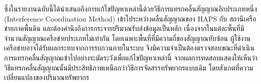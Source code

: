 ซึ่งในรายงานฉบับนี้ได้นำเสนอถึงการแก้ไขปัญหาเหล่านี้ด้วยวิธีการแทรกคลื่นสัญญาณอีกประเภทหนึ่ง
(Interference Coordination Method) เข้าไประหว่างคลื่นสัญญาณของ HAPS กับ สถานีเครือข่ายภาคพื้นดิน
และต้องคำนึงถึงการกระจายปริมาณรับส่งข้อมูลเป็นหลัก เนื่องจากในแต่ละพื้นที่มีจำนวนสัญญาณเครือข่ายประเภทไม่เท่ากัน โดยเฉพาะพื้นที่ที่มีความถี่ของสัญญาณทับซ้อน
ผู้ใช้งานเครือข่ายอาจได้รับผลกระทบจากการรบกวนภายในระบบ จึงมีความจำเป็นต้องตรวจสอบขณะที่ดำเนินการแทรกคลื่นสัญญาณเข้าไปอย่างระมัดระวังเพื่อแก้ไขปัญหาเหล่านี้
จากผลการทดสอบแสดงให้เห็นว่าวิธีแทรกคลื่นสัญญาณนั้นมีประสิทธิภาพเหนือกว่าวิธีการจัดสรรทรัพยากรแบบเดิม โดยสังเกตที่ความเปลี่ยนแปลงของปริมาณทรัพยากร
